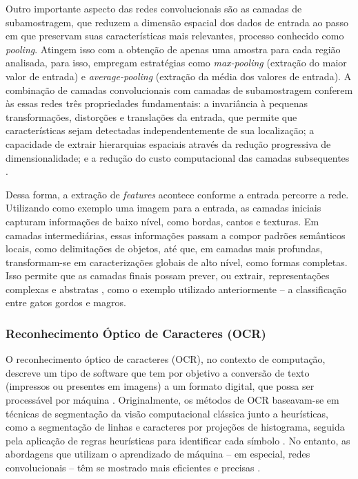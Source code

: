 Outro importante aspecto das redes convolucionais são as camadas de subamostragem, que reduzem a dimensão espacial dos dados de entrada ao passo em que preservam suas características mais relevantes, processo conhecido como \textit{pooling}. Atingem isso com a obtenção de apenas uma amostra para cada região analisada, para isso, empregam estratégias como \textit{max-pooling} (extração do maior valor de entrada) e \textit{average-pooling} (extração da média dos valores de entrada). A combinação de camadas convolucionais com camadas de subamostragem conferem às essas redes três propriedades fundamentais: a invariância à pequenas transformações, distorções e translações da entrada, que permite que características sejam detectadas independentemente de sua localização; a capacidade de extrair hierarquias espaciais através da redução progressiva de dimensionalidade; e a redução do custo computacional das camadas subsequentes \cite{origindl}.

Dessa forma, a extração de \textit{features} acontece conforme a entrada percorre a rede. Utilizando como exemplo uma imagem para a entrada, as camadas iniciais capturam informações de baixo nível, como bordas, cantos e texturas. Em camadas intermediárias, essas informações passam a compor padrões semânticos locais, como delimitações de objetos, até que, em camadas mais profundas, transformam-se em caracterizações globais de alto nível, como formas completas. Isso permite que as camadas finais possam prever, ou extrair, representações complexas e abstratas \cite{reviewdeep}, como o exemplo utilizado anteriormente -- a classificação entre gatos gordos e magros.

\subsubsection{Reconhecimento Óptico de Caracteres (OCR)}

O reconhecimento óptico de caracteres (OCR), no contexto de computação, descreve um tipo de software que tem por objetivo a conversão de texto (impressos ou presentes em imagens) a um formato digital, que possa ser processável por máquina \cite{ocr}. Originalmente, os métodos de OCR baseavam-se em técnicas de segmentação da visão computacional clássica junto a heurísticas, como a segmentação de linhas e caracteres por projeções de histograma, seguida pela aplicação de regras heurísticas para identificar cada símbolo \cite{ocr2}. No entanto, as abordagens que utilizam o aprendizado de máquina -- em especial, redes convolucionais -- têm se mostrado mais eficientes e precisas \cite{ocr2}.

